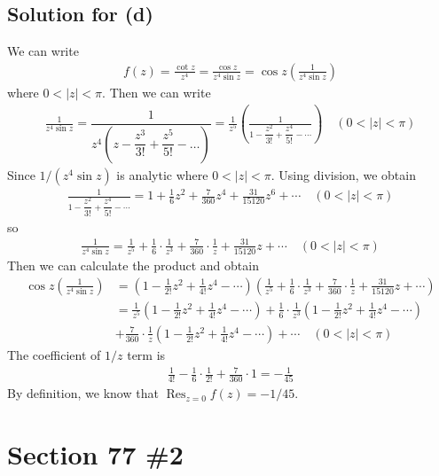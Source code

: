 \documentclass{scrartcl}
\DeclareMathOperator*{\Res}{Res}
\begin{document}
\subsection{Solution for (d)}
We can write
\begin{align*}
  f(z) = \frac{\cot z}{z^4} = \frac{\cos z}{z^4 \sin z} = \cos z \left( \frac{1}{z^4 \sin z} \right)
\end{align*}
where \(0 < |z| < \pi\).
Then we can write
\begin{align*}
  \frac{1}{z^4 \sin z}
  = \dfrac{1}{z^4 \left( z - \dfrac{z^3}{3!} + \dfrac{z^5}{5!} - \dots \right)}
  = \frac{1}{z^5} \left( \frac{1}{1 - \dfrac{z^2}{3!} + \dfrac{z^4}{5!} - \cdots} \right) \quad (0 < |z| < \pi)
\end{align*}
Since \(1 / (z^4 \sin z)\) is analytic where \(0 < |z| < \pi\).
Using division, we obtain
\begin{align*}
  \frac{1}{1 - \dfrac{z^2}{3!} + \dfrac{z^4}{5!} - \cdots} = 1 + \frac{1}{6} z^2 + \frac{7}{360} z^4 + \frac{31}{15120} z^6 + \cdots \quad (0 < |z| < \pi)
\end{align*}
so
\begin{align*}
  \frac{1}{z^4 \sin z} = \frac{1}{z^5} + \frac{1}{6} \cdot \frac{1}{z^3} + \frac{7}{360} \cdot \frac{1}{z} + \frac{31}{15120} z + \cdots \quad (0 < |z| < \pi)
\end{align*}
Then we can calculate the product and obtain
\begin{align*}
  \cos z \left( \frac{1}{z^4 \sin z} \right)
  &= \left( 1 - \frac{1}{2!} z^2 + \frac{1}{4!} z^4 - \cdots \right) \left( \frac{1}{z^5} + \frac{1}{6} \cdot \frac{1}{z^3} + \frac{7}{360} \cdot \frac{1}{z} + \frac{31}{15120} z + \cdots \right) \\
  &= \frac{1}{z^5} \left( 1 - \frac{1}{2!} z^2 + \frac{1}{4!} z^4 - \cdots \right) + \frac{1}{6} \cdot \frac{1}{z^3} \left( 1 - \frac{1}{2!} z^2 + \frac{1}{4!} z^4 - \cdots \right) \\
  &+ \frac{7}{360} \cdot \frac{1}{z} \left( 1 - \frac{1}{2!} z^2 + \frac{1}{4!} z^4 - \cdots \right) + \cdots \quad (0 < |z| < \pi)
\end{align*}
The coefficient of \(1 / z\) term is
\begin{align*}
  \frac{1}{4!} - \frac{1}{6} \cdot \frac{1}{2!} + \frac{7}{360} \cdot 1 = -\frac{1}{45}
\end{align*}
By definition, we know that \(\Res_{z = 0} f(z) = -1 / 45\).

\section{Section 77 \#2}
\end{document}
